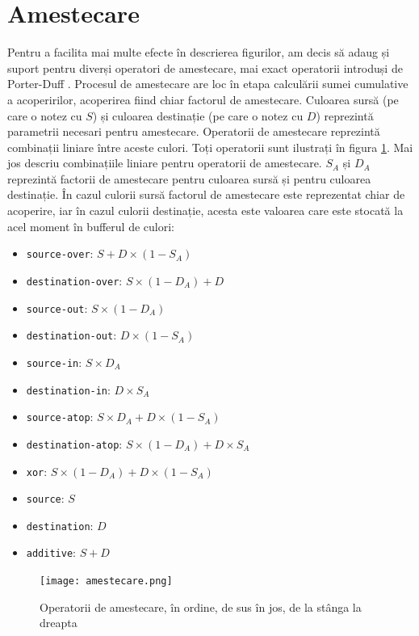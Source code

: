 \documentclass[a4paper, 12pt]{report}
\begin{document}
\section{Amestecare}

Pentru a facilita mai multe efecte în descrierea figurilor, am decis să adaug și suport pentru diverși operatori de amestecare,
mai exact operatorii introduși de Porter-Duff \cite{Porter-Duff}. Procesul de amestecare are loc în etapa calculării sumei
cumulative a acoperirilor, acoperirea fiind chiar factorul de amestecare. Culoarea sursă (pe care o notez cu \(S\)) și culoarea
destinație (pe care o notez cu \(D\)) reprezintă parametrii necesari pentru amestecare. Operatorii de amestecare reprezintă
combinații liniare între aceste culori. Toți operatorii sunt ilustrați în figura \ref{fig-alpha-compositing}. Mai jos descriu
combinațiile liniare pentru operatorii de amestecare. \(S_A\) și \(D_A\) reprezintă factorii de amestecare pentru culoarea sursă
și pentru culoarea destinație. În cazul culorii sursă factorul de amestecare este reprezentat chiar de acoperire, iar în cazul
culorii destinație, acesta este valoarea care este stocată la acel moment în bufferul de culori:

\begin{itemize}
    \item{\texttt{source-over}: \(S + D \times (1 - S_A)\)}
    \item{\texttt{destination-over}: \(S \times (1 - D_A) + D\)}
    \item{\texttt{source-out}: \(S \times (1 - D_A)\)}
    \item{\texttt{destination-out}: \(D \times (1 - S_A)\)}
    \item{\texttt{source-in}: \(S \times D_A\)}
    \item{\texttt{destination-in}: \(D \times S_A\)}
    \item{\texttt{source-atop}: \(S \times D_A + D \times (1 - S_A)\)}
    \item{\texttt{destination-atop}: \(S \times (1 - D_A) + D \times S_A\)}
    \item{\texttt{xor}: \(S \times (1 - D_A) + D \times (1 - S_A) \)}
    \item{\texttt{source}: \(S\)}
    \item{\texttt{destination}: \(D\)}
    \item{\texttt{additive}: \(S + D\)}
\end{itemize}

\begin{figure}[ht]
    \texttt{[image: amestecare.png]}
    \centering
    \caption{Operatorii de amestecare, în ordine, de sus în jos, de la stânga la dreapta}
    \label{fig-alpha-compositing}
\end{figure}
\end{document}
